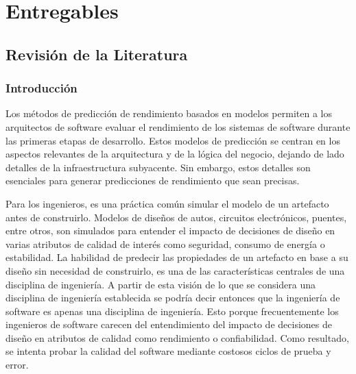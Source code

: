 \documentclass[11pt, twoside]{report}
\begin{document}


\chapter{Entregables}

\section{Revisión de la Literatura} \label{sec:revision-literatura}

\subsection{Introducción}
Los métodos de predicción de rendimiento basados en modelos permiten a los arquitectos de software evaluar el rendimiento de los sistemas de software durante las primeras etapas de desarrollo. Estos modelos de predicción se centran en los aspectos relevantes de la arquitectura y de la lógica del negocio, dejando de lado detalles de la infraestructura subyacente. Sin embargo, estos detalles son esenciales para generar predicciones de rendimiento que sean precisas.

Para los ingenieros, es una práctica común simular el modelo de un artefacto antes de construirlo. Modelos de diseños de autos, circuitos electrónicos, puentes, entre otros, son simulados para entender el impacto de decisiones de diseño en varias atributos de calidad de interés como seguridad, consumo de energía o estabilidad. La habilidad de predecir las propiedades de un artefacto en base a su diseño sin necesidad de construirlo, es una de las características centrales de una disciplina de ingeniería. A partir de esta visión de lo que se considera una disciplina de ingeniería establecida se podría decir entonces que la ingeniería de software es apenas una disciplina de ingeniería\cite{palladio-blue-book}. Esto porque frecuentemente los ingenieros de software carecen del entendimiento del impacto de decisiones de diseño en atributos de calidad como rendimiento o confiabilidad. Como resultado, se intenta probar la calidad del software mediante costosos ciclos de prueba y error.
\end{document}
